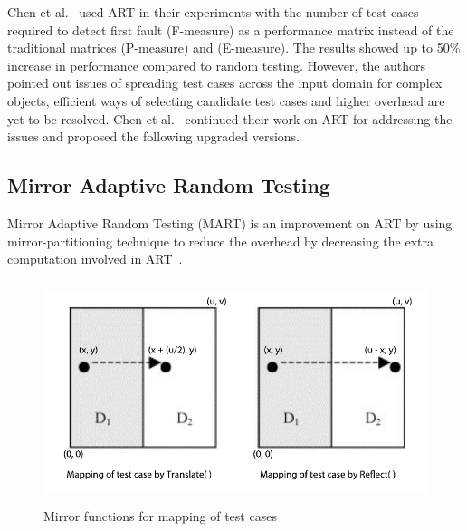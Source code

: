 Chen et al.~\cite{chen2005adaptive} used ART in their experiments with the number of test cases required to detect first fault (F-measure) as a performance matrix instead of the traditional matrices (P-measure) and (E-measure). The results showed up to 50\% increase in performance compared to random testing. However, the authors pointed out issues of spreading test cases across the input domain for complex objects, efficient ways of selecting candidate test cases and higher overhead are yet to be resolved. Chen et al.~\cite{chen2009enhanced} continued their work on ART for addressing the issues and proposed the following upgraded versions. 

\subsection{Mirror Adaptive Random Testing}
Mirror Adaptive Random Testing (MART) is an improvement on ART by using mirror-partitioning technique to reduce the overhead by decreasing the extra computation involved in ART~\cite{chen2004mirror}. 

\begin{figure}[h]
\begin{center}
	\includegraphics[width=13.5cm, height=6.5cm ]{chapter2/mart2.pdf}
	\caption{Mirror functions for mapping of test cases}
\label{fig:mirrorART}
\end{center}  
\end{figure}

